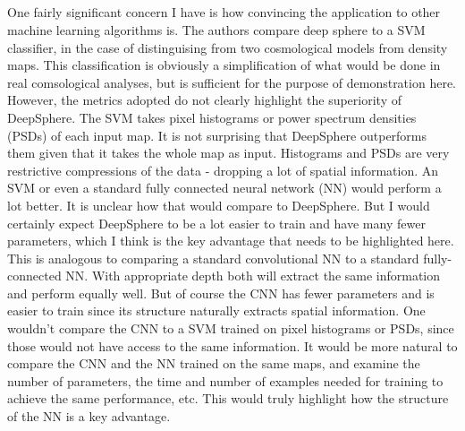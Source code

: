 \documentclass[12pt,a4paper]{article}
\newcommand{\todo}[1]{{\color[rgb]{.6,.1,.6}{TODO: #1}}}
\begin{document}
\todo{Thanks the reviewer}


\subsection{}
\begin{mdframed}[style=comment] 
One fairly significant concern I have is how convincing the application to other machine learning algorithms is. The authors compare deep sphere to a SVM classifier, in the case of distinguising from two cosmological models from density maps. This classification is obviously a simplification of what would be done in real comsological analyses, but is sufficient for the purpose of demonstration here. However, the metrics adopted do not clearly highlight the superiority of DeepSphere. The SVM takes pixel histograms or power spectrum densities (PSDs) of each input map. It is not surprising that DeepSphere outperforms them given that it takes the whole map as input. Histograms and PSDs are very restrictive compressions of the data - dropping a lot of spatial information. An SVM or even a standard fully connected neural network (NN) would perform a lot better. It is unclear how that would compare to DeepSphere. But I would certainly expect DeepSphere to be a lot easier to train and have many fewer parameters, which I think is the key advantage that needs to be highlighted here. This is analogous to comparing a standard convolutional NN to a standard fully-connected NN. With appropriate depth both will extract the same information and perform equally well. But of course the CNN has fewer parameters and is easier to train since its structure naturally extracts spatial information. One wouldn't compare the CNN to a SVM trained on pixel histograms or PSDs, since those would not have access to the same information. It would be more natural to compare the CNN and the NN trained on the same maps, and examine the number of parameters, the time and number of examples needed for training to achieve the same performance, etc. This would truly highlight how the structure of the NN is a key advantage.
\end{mdframed}

\todo{General answer:
\begin{itemize}
  \item `An SVM or even a standard fully connected neural network (NN) would perform a lot better.'
  a) I think that SVM fails (I think this this an overfitting problem. This is the case at least for the noiseless case, TO CHECK)
  b) NN is computationally not even possible, or it would have to be a very striped down version of the network... We can actually try...
  \item The reviewer is correct with respect of the number of parameters
\end{itemize}
We should probably add to comparing curves SVM and fully connected
}
\end{document}
